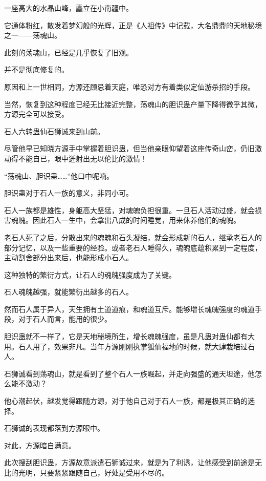 
\begin{this_body}

一座高大的水晶山峰，矗立在小南疆中。

它通体粉红，散发着梦幻般的光辉，正是《人祖传》中记载，大名鼎鼎的天地秘境之一——荡魂山。

此刻的荡魂山，已经是几乎恢复了旧观。

并不是彻底修复的。

原因和上一世相同，方源还顾忌着天庭，唯恐对方有着类似定仙游杀招的手段。

当然，恢复到这种程度已经无比接近完整，荡魂山的胆识蛊产量下降得微乎其微，方源完全可以接受。

石人六转蛊仙石狮诚来到山前。

尽管他早已知晓方源手中掌握着胆识蛊，但当他亲眼仰望着这座传奇山峦，仍旧激动得不能自已，眼中迸射出无以伦比的激情！

“荡魂山、胆识蛊……”他口中呢喃。

胆识蛊对于石人一族的意义，非同小可。

石人一族都是雄性，身躯高大坚猛，对魂魄负担很重。一旦石人活动过盛，就会损害魂魄。因此石人一生中，会拿出八成的时间睡觉，用来休养他们的魂魄。

老石人死了之后，分散出来的魂魄和石头凝结，就会形成新的石人，继承老石人的部分记忆，以及一些重要的经验。或者老石人睡得久，魂魄底蕴积累到一定程度，主动割舍部分出来后，也能形成小石人。

这种独特的繁衍方式，让石人的魂魄强度成为了关键。

石人魂魄越强，就能繁衍出越多的石人。

然而石人属于异人，天生拥有土道道痕，和魂道互斥。能够增长魂魄强度的魂道手段，对于石人而言，能用的很少。

胆识蛊就不一样了，它是天地秘境所生，增长魂魄强度，虽是凡蛊对蛊仙都有大用。石人用了，效果非凡。当年方源刚刚执掌狐仙福地的时候，就大肆栽培过石人。

石狮诚看到荡魂山，就是看到了整个石人一族崛起，并走向强盛的通天坦途，他怎么能不激动？

他心潮起伏，越发觉得跟随方源，对于他自己对于石人一族，都是极其正确的选择。

石狮诚的表现都落到方源眼中。

对此，方源暗自满意。

此次搜刮胆识蛊，方源故意派遣石狮诚过来，就是为了利诱，让他感受到前途是无比的光明，只要紧紧跟随自己，好处是受用不尽的。


\end{this_body}
